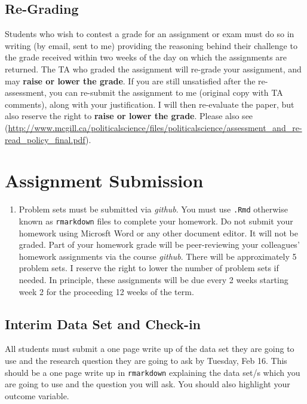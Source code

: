 \documentclass[11pt,]{article}
\providecommand{\tightlist}{%
  \setlength{\itemsep}{0pt}\setlength{\parskip}{0pt}}
\begin{document}
\subsection{Re-Grading}\label{re-grading}

Students who wish to contest a grade for an assignment or exam must do
so in writing (by email, sent to me) providing the reasoning behind
their challenge to the grade received within two weeks of the day on
which the assignments are returned. The TA who graded the assignment
will re-grade your assignment, and may \textbf{raise or lower the
grade}. If you are still unsatisfied after the re-assessment, you can
re-submit the assignment to me (original copy with TA comments), along
with your justification. I will then re-evaluate the paper, but also
reserve the right to \textbf{raise or lower the grade}. Please also see
(\url{http://www.mcgill.ca/politicalscience/files/politicalscience/assessment_and_re-read_policy_final.pdf}).

\section{Assignment Submission}\label{assignment-submission}

\begin{enumerate}
\def\labelenumi{\arabic{enumi}.}
\tightlist
\item
  Problem sets must be submitted via \emph{github}. You must use
  \texttt{.Rmd} otherwise known as \texttt{rmarkdown} files to complete
  your homework. Do not submit your homework using Microsft Word or any
  other document editor. It will not be graded. Part of your homework
  grade will be peer-reviewing your colleagues' homework assignments via
  the course \emph{github}. There will be approximately 5 problem sets.
  I reserve the right to lower the number of problem sets if needed. In
  principle, these assignments will be due every 2 weeks starting week 2
  for the proceeding 12 weeks of the term.
\end{enumerate}

\subsection{Interim Data Set and
Check-in}\label{interim-data-set-and-check-in}

All students must submit a one page write up of the data set they are
going to use and the research question they are going to ask by Tuesday,
Feb 16. This should be a one page write up in \texttt{rmarkdown}
explaining the data set/s which you are going to use and the question
you will ask. You should also highlight your outcome variable.
\end{document}
